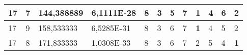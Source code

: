 \documentclass[conference]{IEEEtran}
\begin{document}
\begin{table*}[]
\begin{tabular}{|llll|llllllll|}
\multicolumn{1}{|l|}{17}                                                    & \multicolumn{1}{l|}{7}                                                        & \multicolumn{1}{l|}{144,388889}                                                   & 6,1111E-28                     & \multicolumn{1}{l|}{8}                                                  & \multicolumn{1}{l|}{3}                                                  & \multicolumn{1}{l|}{5}                                                  & \multicolumn{1}{l|}{7}                                                  & \multicolumn{1}{l|}{\textbf{1}}                                         & \multicolumn{1}{l|}{4}                                                  & \multicolumn{1}{l|}{6}                                                  & 2                          \\ \hline
\multicolumn{1}{|l|}{17}                                                    & \multicolumn{1}{l|}{9}                                                        & \multicolumn{1}{l|}{158,533333}                                                   & 6,5285E-31                     & \multicolumn{1}{l|}{8}                                                  & \multicolumn{1}{l|}{3}                                                  & \multicolumn{1}{l|}{6}                                                  & \multicolumn{1}{l|}{7}                                                  & \multicolumn{1}{l|}{\textbf{1}}                                         & \multicolumn{1}{l|}{4}                                                  & \multicolumn{1}{l|}{5}                                                  & 2                          \\ \hline
\multicolumn{1}{|l|}{17}                                                    & \multicolumn{1}{l|}{8}                                                        & \multicolumn{1}{l|}{171,833333}                                                   & 1,0308E-33                     & \multicolumn{1}{l|}{8}                                                  & \multicolumn{1}{l|}{3}                                                  & \multicolumn{1}{l|}{6}                                                  & \multicolumn{1}{l|}{7}                                                  & \multicolumn{1}{l|}{2}                                                  & \multicolumn{1}{l|}{5}                                                  & \multicolumn{1}{l|}{4}                                                  & \textbf{1}                 \\ \hline

\end{tabular}
\end{table*}
\end{document}
